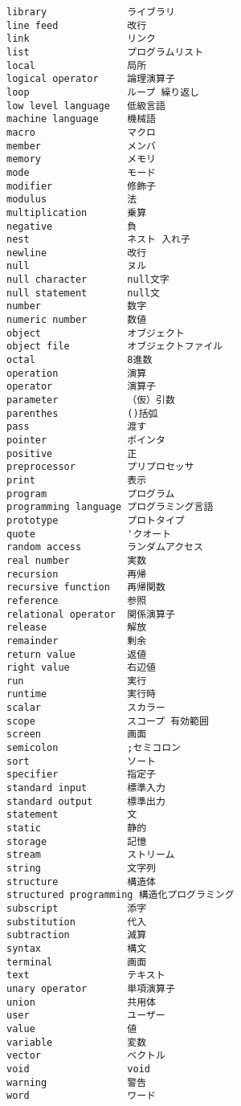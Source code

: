 \documentclass[12pt,a4j]{jarticle}
\begin{document}
{\begin{multicols}{3}
{\begin{verbatim}
library              ライブラリ
line feed            改行
link                 リンク
list                 プログラムリスト
local                局所
logical operator     論理演算子
loop                 ループ 繰り返し
low level language   低級言語
machine language     機械語
macro                マクロ
member               メンバ
memory               メモリ
mode                 モード
modifier             修飾子
modulus              法
multiplication       乗算
negative             負
nest                 ネスト 入れ子
newline              改行
null                 ヌル
null character       null文字
null statement       null文
number               数字
numeric number       数値
object               オブジェクト
object file          オブジェクトファイル
octal                8進数
operation            演算
operator             演算子
parameter            （仮）引数
parenthes            ()括弧
pass                 渡す
pointer              ポインタ
positive             正
preprocessor         プリプロセッサ
print                表示
program              プログラム
programming language プログラミング言語
prototype            プロトタイプ
quote                'クオート
random access        ランダムアクセス
real number          実数
recursion            再帰
recursive function   再帰関数
reference            参照
relational operator  関係演算子
release              解放
remainder            剰余
return value         返値
right value          右辺値
run                  実行
runtime              実行時
scalar               スカラー
scope                スコープ 有効範囲
screen               画面
semicolon            ;セミコロン
sort                 ソート
specifier            指定子
standard input       標準入力
standard output      標準出力
statement            文
static               静的
storage              記憶
stream               ストリーム
string               文字列
structure            構造体
structured programming 構造化プログラミング
subscript            添字
substitution         代入
subtraction          減算
syntax               構文
terminal             画面
text                 テキスト
unary operator       単項演算子
union                共用体
user                 ユーザー
value                値
variable             変数
vector               ベクトル
void                 void
warning              警告
word                 ワード
\end{verbatim}
}
\end{multicols}

}

\clearpage
\end{document}
